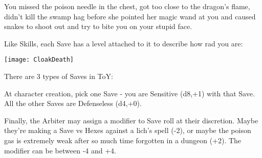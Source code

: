 {  You missed the poison needle in the chest, got too close to the dragon's flame, didn't kill the swamp hag before she pointed her magic wand at you and caused snakes to shoot out and try to bite you on your stupid face.

  Like Skills, each Save has a level attached to it to describe how rad you are:




 \cbreak

    \begin{center}
  \texttt{[image: CloakDeath]}
  \end{center}

  There are 3 types of Saves in ToY:


  At character creation, pick one Save - you are Sensitive (d8,+1) with that Save.  All the other Saves are Defenseless (d4,+0).

  Finally, the Arbiter may assign a modifier to Save roll at their discretion.  Maybe they're making a Save vs Hexes against a lich's spell (-2), or maybe the poison gas is extremely weak after so much time forgotten in a dungeon (+2).  The modifier can be between -4 and +4.

} %

